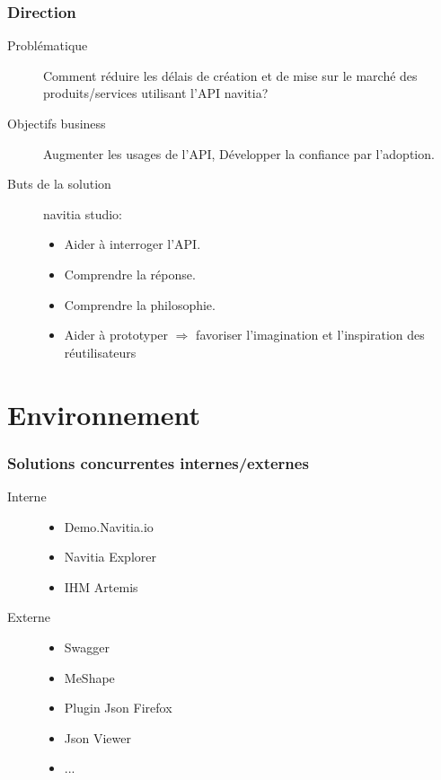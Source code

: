 \documentclass[table]{beamer}
\begin{document}
\begin{frame}
  \frametitle{Direction}

  \begin{description}
  \item[Problématique] Comment réduire les délais de création et de
    mise sur le marché des produits/services utilisant l'API navitia?
  \item[Objectifs business] Augmenter les usages de l'API, Développer
    la confiance par l'adoption.
  \item[Buts de la solution] navitia studio:
    \begin{itemize}
    \item Aider à interroger l'API.
    \item Comprendre la réponse.
    \item Comprendre la philosophie.
    \item Aider à prototyper $\Rightarrow$ favoriser l'imagination et
      l'inspiration des réutilisateurs
    \end{itemize}
  \end{description}
\end{frame}


\section{Environnement}

\begin{frame}
  \frametitle{Solutions concurrentes internes/externes}
  \begin{description}
    \item[Interne]
      \begin{itemize} 
        \item Demo.Navitia.io
        \item Navitia Explorer
        \item IHM Artemis
      \end{itemize}
  \end{description}
    \begin{description}
    \item[Externe] 
    \begin{itemize} 
      \item Swagger 
      \item MeShape 
      \item Plugin Json Firefox
      \item Json Viewer
      \item ...
    \end{itemize}
  \end{description}
\end{frame}
\end{document}
